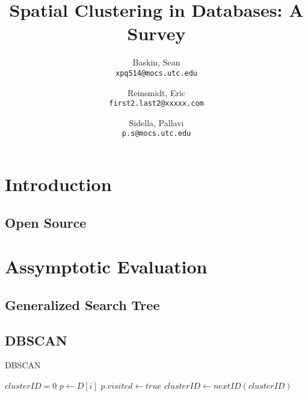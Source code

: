 \documentclass{article}
\author{
  Baskin, Sean\\
  \texttt{xpq514@mocs.utc.edu}
  \and
  Reinsmidt, Eric\\
  \texttt{first2.last2@xxxxx.com}
  \and
  Sidella, Pallavi\\
  \texttt{p.s@mocs.utc.edu}
}
\title{Spatial Clustering in Databases: A Survey}
\begin{document}
\maketitle

\section{Introduction}

\subsection{Open Source}

\section{Assymptotic Evaluation}

\subsection{Generalized Search Tree}

\subsection{DBSCAN}

\begin{algorithm}
\caption{DBSCAN}
\begin{algorithmic}[1]
	\State $clusterID = 0$
      \State $p \gets D[i]$
      \State $p.visited \gets true$    
          \State $clusterID \gets nextID(clusterID)$
        \EndIf
      \EndIf
	\EndFor
\EndProcedure
\end{algorithmic}
\end{algorithm}
\end{document}
